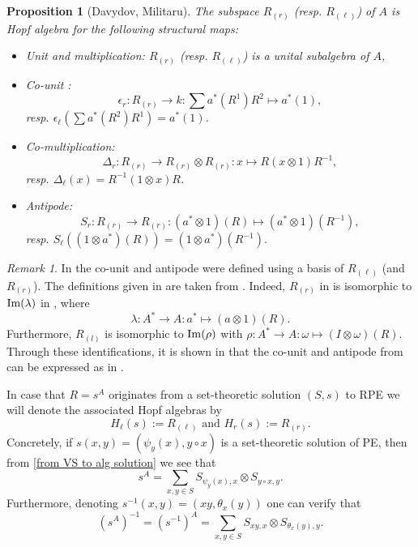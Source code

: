 \documentclass[a4paper,10pt]{amsart}
\newtheorem{proposition}[lemma]{Proposition}
\theoremstyle{definition}
\theoremstyle{remark}
\newtheorem{remark}[lemma]{Remark}
\newcommand\Ima{{\rm Im}}
\newcommand\D{\Delta}
\newcommand\ot{\otimes}
\begin{document}
\begin{proposition}[Davydov, Militaru]\label{structure maps coefficients hopf algebras}
The subspace $R_{(r)}$ (resp. $R_{(\ell)}$) of $A$ is Hopf algebra for the following structural maps:
\begin{itemize}
    \item Unit and multiplication: $R_{(r)}$ (resp. $R_{(\ell)}$) is a unital subalgebra of $A$,
    \item Co-unit : 
    $$\epsilon_{r}: R_{(r)} \rightarrow k : \sum a^*(R^1) R^2 \mapsto a^*(1),$$
    resp. $\epsilon_{\ell}(\sum a^*(R^2) R^1)= a^*(1)$.
    \item Co-multiplication: 
    $$\D_{r}: R_{(r)} \rightarrow R_{(r)} \ot R_{(r)}: x \mapsto R(x\otimes 1)R^{-1}, $$ 
    resp. $\D_{\ell}(x) = R^{-1}(1 \otimes x)R $.
    \item Antipode: 
    $$S_{r}: R_{(r)} \rightarrow R_{(r)}: (a^* \ot 1)(R) \mapsto (a^* \ot 1)(R^{-1}),$$
    resp. $S_{\ell}((1\ot a^*)(R)) = (1 \ot a^*)(R^{-1}).$
\end{itemize}
\end{proposition}

\begin{remark}\label{militaru vs davydov}
    In \cite[Theorem 2.1]{Mi04} the co-unit and antipode were defined using a basis of $R_{(\ell)}$ (and $R_{(r)}$). The definitions given in  are taken from \cite[Section 5]{Dav}. Indeed, $R_{(r)}$ in \cite{Mi04} is isomorphic to $\Ima (\lambda)$ in \cite{Dav}, where
    $$\lambda: A^* \rightarrow A: a^* \mapsto (a \otimes 1)(R) .$$
    Furthermore, $R_{(l)}$ is isomorphic to $\Ima(\rho)$ with $\rho: A^* \rightarrow A: \omega \mapsto (I \otimes \omega)(R)$. Through these identifications, it is shown in
    \cite[Proposition 5.4 \& 5.5]{Dav} that the co-unit and antipode from \cite{Mi04} can be expressed as in .
\end{remark}

 In case that $R = s^{A}$ originates from a set-theoretic solution $(S,s)$ to RPE we will denote the associated Hopf algebras by 
$$H_{\ell}(s) := R_{(\ell)} \text{ and } H_r(s) := R_{(r)}.$$ 
Concretely, if $s(x,y) = (\psi_y(x), y \circ x)$ is a set-theoretic solution of PE, then from \eqref{from VS to alg solution} we see that
$$s^{A} = \sum\limits_{x,y\in S} S_{\psi_y(x), x}\otimes S_{y \circ x,y}.$$
Furthermore, denoting $s^{-1}(x,y) =(xy,\theta_x(y))$ one can verify that 
\begin{equation}
    (s^{A})^{-1} = (s^{-1})^{A} = \sum\limits_{x,y\in S} S_{xy, x}\otimes S_{\theta_x(y),y}.
\end{equation}
\end{document}
